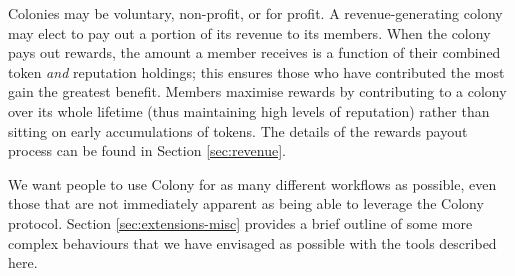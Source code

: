 Colonies may be voluntary, non-profit, or for profit. A revenue-generating colony may elect to pay out a portion of its revenue to its members. When the colony pays out rewards, the amount a member receives is a function of their combined token \textit{and} reputation holdings; this ensures those who have contributed the most gain the greatest benefit. Members maximise rewards by contributing to a colony over its whole lifetime (thus maintaining high levels of reputation) rather than sitting on early accumulations of tokens. The details of the rewards payout process can be found in Section \ref{sec:revenue}.

We want people to use Colony for as many different workflows as possible, even those that are not immediately apparent as being able to leverage the Colony protocol. Section \ref{sec:extensions-misc} provides a brief outline of some more complex behaviours that we have envisaged as possible with the tools described here.